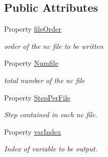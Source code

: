 \subsection*{Public Attributes}
\begin{DoxyCompactItemize}
\item 
Property \hyperlink{class_ndg_nc_file_a09f8e0187bc7042d2905d4f76818b3d8}{file\+Order}
\begin{DoxyCompactList}\small\item\em order of the nc file to be written \end{DoxyCompactList}\item 
Property \hyperlink{class_ndg_nc_file_a2a6c2263de6f3888b2d375af4fa9b64b}{Numfile}
\begin{DoxyCompactList}\small\item\em total number of the nc file \end{DoxyCompactList}\item 
Property \hyperlink{class_ndg_nc_file_a6fab01c746eec2c50d2e07b76a16cdbb}{Step\+Per\+File}
\begin{DoxyCompactList}\small\item\em Step contained in each nc file. \end{DoxyCompactList}\item 
Property \hyperlink{class_ndg_nc_file_a43947e80afdb0b619ec981785ddc21bc}{var\+Index}
\begin{DoxyCompactList}\small\item\em Index of variable to be output. \end{DoxyCompactList}\end{DoxyCompactItemize}
